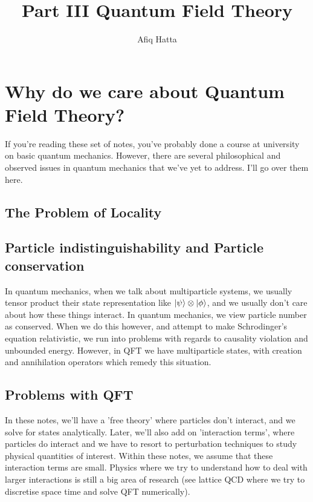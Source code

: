 \documentclass[11pt, oneside]{article}   	%
\title{Part III Quantum Field Theory}
\author{Afiq Hatta }
\theoremstyle{newline}
\theoremstyle{newline}
\theoremstyle{newline}
\theoremstyle{newline}
\theoremstyle{newline}
\begin{document}
 

\maketitle

\pagebreak 
\tableofcontents

\pagebreak

\section{Why do we care about Quantum Field Theory? } 

If you're reading these set of notes, you've probably done a course at university on basic quantum mechanics. However, there are several philosophical and observed issues in quantum mechanics that we've yet to address. I'll go over them here. 


\subsection{The Problem of Locality} 
\subsection{Particle indistinguishability and Particle conservation}
In quantum mechanics, when we talk about multiparticle systems, we usually tensor product their state representation like $\ket{\psi} \otimes \ket{\phi}$, and we usually don't care about how these things interact. In quantum mechanics, we view particle number as conserved. When we do this however, and attempt to make Schrodinger's equation relativistic, we run into problems with regards to causality violation and unbounded energy. However, in QFT we have multiparticle states, with creation and annihilation operators which remedy this situation. 

\subsection{Problems with QFT} 
In these notes, we'll have a 'free theory' where particles don't interact, and we solve for states analytically. Later, we'll also add on 'interaction terms', where particles do interact and we have to resort to perturbation techniques to study physical quantities of interest. Within these notes, we assume that these interaction terms are small. Physics where we try to understand how to deal with larger interactions is still a big area of research (see lattice QCD where we try to discretise space time and solve QFT numerically). 
\end{document}

